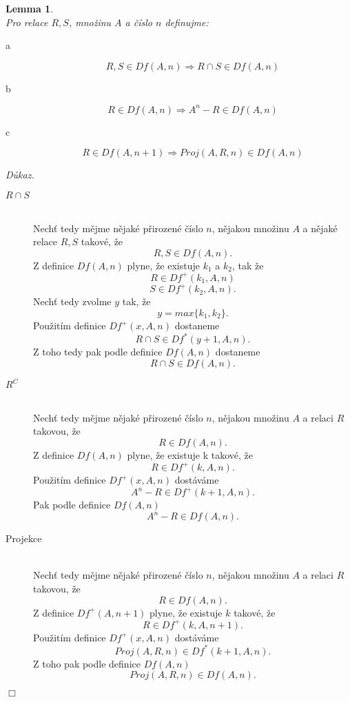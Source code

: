 \documentclass[12pt,a4paper]{article}
\newtheorem{lemma}[veta]{Lemma}
\newenvironment{proof}
{\noindent \textit{D\r{u}kaz.}}
{\hspace*{\fill} $\Box$}
\begin{document}
\begin{lemma}~\\
Pro relace $ R,S $, mno\v{z}inu $ A $ a \v{c}\'{i}slo $ n $ definujme:
\begin{description}
\item[a] 
\[ R,S \in Df(A,n) \Rightarrow R \cap S \in Df(A,n)  \]
\item[b] 
\[ R \in Df(A,n) \Rightarrow A^n-R \in Df(A,n)  \]
\item[c] 
\[ R \in Df(A,n+1) \Rightarrow Proj(A,R,n) \in Df(A,n)  \]
\end{description}
\label{lem:uzavr}
\end{lemma}
\begin{proof}
~\\
\begin{description}
\item[ $ R \cap S $ ]
~\\
Nech\v{t} tedy m\v{e}jme n\v{e}jak\'{e} p\v{r}irozen\'{e} \v{c}\'{i}slo $n$, n\v{e}jakou mno\v{z}inu $A$ a n\v{e}jak\'{e }relace $R,S$ takov\'{e}, \v{z}e \[ R,S \in Df(A,n) .\]
Z definice $ Df(A,n)$ plyne, \v{z}e existuje $k_1$ a $k_2 $, tak \v{z}e 
\[ R \in Df^+(k_1,A,n)  \] 
\[ S \in Df^+(k_2,A,n) .\]  
Nech\v{t} tedy zvolme $ y $ tak, \v{z}e \[ y=max\{k_1,k_2\}. \] Pou\v{z}it\'{i}m definice  $ Df^+(x,A,n) $ dostaneme
\[ R \cap S \in Df^*(y+1,A,n) .\] 
Z toho tedy pak podle definice $Df(A,n)$ dostaneme
\[ R \cap S \in Df(A,n) .\] 
\item[$R^C$]
~\\
Nech\v{t} tedy m\v{e}jme n\v{e}jak\'{e} p\v{r}irozen\'{e} \v{c}\'{i}slo $n$, n\v{e}jakou mno\v{z}inu $A$ a relaci $R$ takovou, \v{z}e \[ R \in Df(A,n) .\]  
Z definice $Df(A,n)$ plyne, \v{z}e existuje k takov\'{e}, \v{z}e 
\[ R \in Df^+(k,A,n) .\]
Pou\v{z}it\'{i}m definice  $ Df^+(x,A,n)$ dost\'{a}v\'{a}me 
\[ A^n-R \in Df^+(k+1,A,n) .\] 
Pak podle definice $Df(A,n)$ 
\[ A^n-R \in Df(A,n)  .\]
\item[Projekce]
~\\
Nech\v{t} tedy m\v{e}jme n\v{e}jak\'{e} p\v{r}irozen\'{e} \v{c}\'{i}slo $n$, n\v{e}jakou mno\v{z}inu $A$ a relaci $R$ takovou, \v{z}e \[ R \in Df(A,n) .\]  
Z definice $ Df^+(A,n+1) $ plyne, \v{z}e existuje $ k $ takov\'{e}, \v{z}e 
\[ R \in Df^+(k,A,n+1) .\]
Pou\v{z}it\'{i}m definice  $ Df^+(x,A,n)$ dost\'{a}v\'{a}me 
\[ Proj(A,R,n)\in Df^*(k+1,A,n) .\] 
Z toho pak podle definice $Df(A,n)$ 
\[ Proj(A,R,n) \in Df(A,n) .\]
\end{description}
\end{proof}
\end{document}
